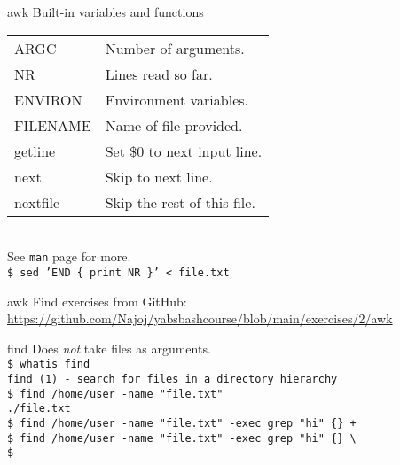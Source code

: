 \documentclass{beamer}
\let\tt\texttt
\let\it\itshape
\begin{document}
\begin{frame}{awk}
        Built-in variables and functions\\
        \begin{tabular}{l|l}
                \hline
            ARGC     & Number of arguments. \\
            NR       & Lines read so far.   \\
            ENVIRON  & Environment variables. \\
            FILENAME & Name of file provided. \\
                \hline
            getline  & Set \$0 to next input line. \\
            next     & Skip to next line. \\
            nextfile & Skip the rest of this file. \\
                \hline
        \end{tabular} \\
        \medskip
        See \tt{man} page for more. \\
        \tt{\$ sed 'END \{ print NR \}' < file.txt} \\
\end{frame}

\begin{frame}{awk}
        Find exercises from GitHub: \\
        \url{https://github.com/Najoj/yabsbashcourse/blob/main/exercises/2/awk}
\end{frame}

\begin{frame}{find}
        Does {\it not} take files as arguments. \\
        \tt{\$ whatis find}\\
        \tt{find (1)  - search for files in a directory hierarchy}\\
        \tt{\$ find /home/user -name "file.txt"} \\
        \tt{./file.txt} \\
        \tt{\$ find /home/user -name "file.txt" -exec grep "hi" \{\} + } \\
        \tt{\$ find /home/user -name "file.txt" -exec grep "hi" \{\} {\textbackslash}\; } \\
        \tt{\$ } \\
\end{frame}
\end{document}
